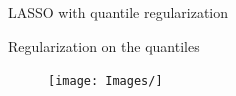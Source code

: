 \documentclass[11pt]{beamer}
\begin{document}
\begin{frame}{LASSO with quantile regularization}
%

\end{frame}

\begin{frame}{Regularization on the quantiles}

\begin{figure}
\centering
\texttt{[image: Images/]}
\end{figure}

\end{frame}
\end{document}
